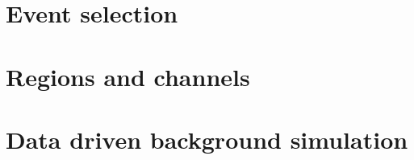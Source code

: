 \section{Event selection}
\label{sec:selection}
\section{Regions and channels}
\label{sec:regions}
\section{Data driven background simulation}
\label{sec:NPL}